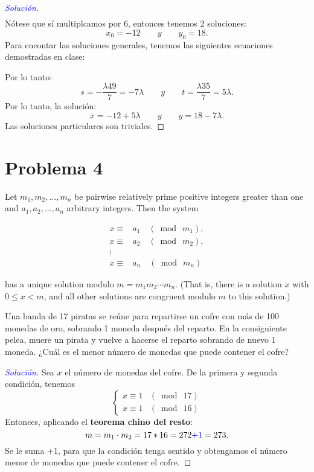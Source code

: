 \documentclass[a4paper,12pt]{article}
\newenvironment{solution}
  {\renewcommand\qedsymbol{$\square$}\begin{proof}[\textcolor{blue}{Solución}]}
  {\end{proof}}
\begin{document}
\begin{enumerate}
\begin{solution}
\begin{align*}
		\end{align*}
		Nótese que sí multiplcamos por 6, entonces tenemos 2 soluciones: 
		$$x_0=-12\qquad y \qquad y_0=18.$$
		Para encontar las soluciones generales, tenemos las siguientes ecuaciones demostradas en clase: 
		\begin{center}
		\end{center}
		Por lo tanto: 
		$$s=-\frac{\lambda49}{7}=-7\lambda \qquad y \qquad t=\frac{\lambda 35}{7}=5\lambda.$$
		Por lo tanto, la solución: 
		$$x=-12+5\lambda \qquad y \qquad  y= 18-7\lambda.$$	
	Las soluciones particulares son triviales.
	\end{solution}
\end{enumerate}

\section{Problema 4}
\begin{tcolorbox}[colback=gray!15,colframe=black!1!black,title=Teorema 2 (Teorema chino del resto) de \cite{rosen2012discrete} de la sección 4.4]
	 Let $m_{1}, m_{2}, \ldots, m_{n}$ be pairwise relatively prime positive integers greater than one and $a_{1}, a_{2}, \ldots, a_{n}$ arbitrary integers. Then the system

	\begin{align*}
		x \equiv & a_{1}\quad \left(\bmod  \ m_{1}\right), \\
		x  \equiv & a_{2}\quad \left(\bmod  \ m_{2}\right), \\
		\vdots\\
		x \equiv & a_{n}\quad \left(\bmod \ m_{n}\right)
	\end{align*}
	
	has a unique solution modulo $m=m_{1} m_{2} \cdots m_{n} .$ (That is, there is a solution $x$ with $0 \leq x<m$, and all other solutions are congruent modulo $m$ to this solution.)
	\end{tcolorbox}
Una banda de 17 piratas se reúne para repartirse un cofre con más de 100 monedas de oro, sobrando 1 moneda después del reparto. En la consiguiente pelea, muere un pirata y vuelve a hacerse el reparto sobrando de nuevo 1 moneda. ¿Cuál es el menor número de monedas que puede contener el cofre?
\begin{solution}
	Sea $x$ el número de monedas del cofre. De la primera y segunda condición, tenemos
	$$\begin{cases}
		x \equiv 1 & (\bmod \ 17 )\\
	    x \equiv 1 & (\bmod \  16)
	\end{cases}$$
Entonces, aplicando el \textbf{teorema chino del resto}:
$$m=m_1\cdot m_2 = 17*16=272  \textcolor{blue}{+1}=273.$$
Se le suma +1, para que la condición tenga sentido y obtengamos el número menor de monedas que puede contener el cofre. 
\end{solution}
\end{document}
